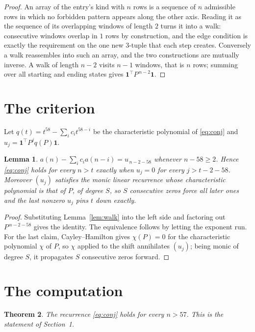 \documentclass[11pt,a4paper]{article}
\theoremstyle{plain}
\newtheorem{theorem}{Theorem}
\newtheorem{lemma}[theorem]{Lemma}
\theoremstyle{definition}
\begin{document}
\begin{proof}
An array of the entry's kind with $n$ rows is a sequence of $n$ admissible rows in
which no forbidden pattern appears along the other axis. Reading it as the sequence of its
overlapping windows of length $2$ turns it into a walk: consecutive windows overlap in
$1$ rows by construction, and the edge condition is exactly the requirement on the one
new $3$-tuple that each step creates. Conversely a walk reassembles into such an array,
and the two constructions are mutually inverse. A walk of length $n-2$ visits $n-1$
windows, that is $n$ rows; summing over all starting and ending states gives
$\mathbf{1}^{\!\top}P^{\,n-2}\mathbf{1}$.
\end{proof}

\section{The criterion}

Let $q(t)=t^{58}-\sum_i c_i t^{58-i}$ be the characteristic polynomial of
\eqref{eq:conj} and $u_j=\mathbf{1}^{\!\top}P^{j}q(P)\mathbf{1}$.

\begin{lemma}\label{lem:crit}
$a(n)-\sum_i c_i a(n-i)=u_{\,n-2-58}$ whenever $n-58\ge2$. Hence
\eqref{eq:conj} holds for every $n>t$ exactly when $u_j=0$ for every
$j>t-2-58$. Moreover $(u_j)$ satisfies the monic linear recurrence whose
characteristic polynomial is that of $P$, of degree $S$, so $S$ consecutive zeros force all
later ones and the last nonzero $u_j$ pins $t$ down exactly.
\end{lemma}

\begin{proof}
Substituting Lemma~\ref{lem:walk} into the left side and factoring out
$P^{\,n-2-58}$ gives the identity. The equivalence follows by letting the exponent
run. For the last claim, Cayley--Hamilton gives $\chi(P)=0$ for the characteristic
polynomial $\chi$ of $P$, so $\chi$ applied to the shift annihilates $(u_j)$; being monic of
degree $S$, it propagates $S$ consecutive zeros forward.
\end{proof}

\section{The computation}

\begin{theorem}
The recurrence \eqref{eq:conj} holds for every $n>57$. This is the statement of
Section~1.
\end{theorem}
\end{document}
